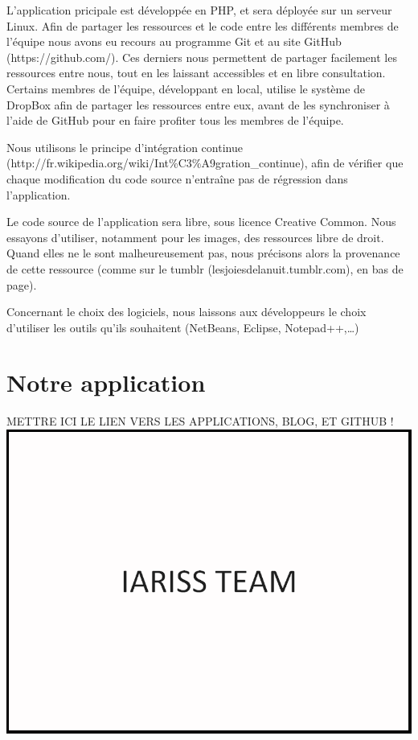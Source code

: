 \documentclass[12pt, a4paper]{article}
\newcommand{\espace}{\vspace{.8cm}}
\begin{document}
L'application pricipale est développée en PHP, et sera déployée sur un serveur Linux. Afin de partager les ressources et le code entre les différents membres de l'équipe nous avons eu recours au programme Git et au site GitHub (https://github.com/). Ces derniers nous permettent de partager facilement les ressources entre nous, tout en les laissant accessibles et en libre consultation.
Certains membres de l'équipe, développant en local, utilise le système de DropBox afin de partager les ressources entre eux, avant de les synchroniser à l'aide de GitHub pour en faire profiter tous les membres de l'équipe.

Nous utilisons le principe d'intégration continue (http://fr.wikipedia.org/wiki/Int\%C3\%A9gration_continue), afin de vérifier que chaque modification du code source n'entraîne pas de régression dans l'application.

Le code source de l'application sera libre, sous licence Creative Common. Nous essayons d'utiliser, notamment pour les images, des ressources libre de droit. Quand elles ne le sont malheureusement pas, nous précisons alors la provenance de cette ressource (comme sur le tumblr (lesjoiesdelanuit.tumblr.com), en bas de page).

Concernant le choix des logiciels, nous laissons aux développeurs le choix d'utiliser les outils qu'ils souhaitent (NetBeans, Eclipse, Notepad++,\ldots{})

\espace{}
\section*{Notre application}
METTRE ICI LE LIEN VERS LES APPLICATIONS, BLOG, ET GITHUB !
\includegraphics[width=.9\textwidth, keepaspectratio=true]{img/test.png}
\end{document}
